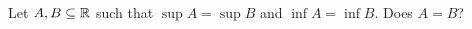 Let $A,B \subseteq \mathbb{R}$ such that $\sup A = \sup B$ and $\inf A = \inf B$. Does $A = B$? 

\begin{tcolorbox}
	\begin{solution}
		
	\end{solution}
\end{tcolorbox}